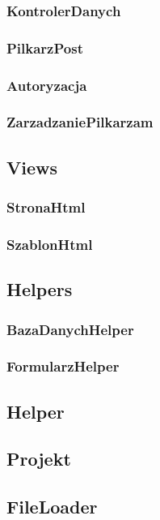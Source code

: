         \subsubsection{KontrolerDanych}
        \subsubsection{PilkarzPost}
        \subsubsection{Autoryzacja}
        \subsubsection{ZarzadzaniePilkarzam}

    \subsection{Views}
        \subsubsection{StronaHtml}
        \subsubsection{SzablonHtml}

    \subsection{Helpers}
        \subsubsection{BazaDanychHelper}
        \subsubsection{FormularzHelper}
        
    \subsection{Helper}
    \subsection{Projekt}
    \subsection{FileLoader}



%           
